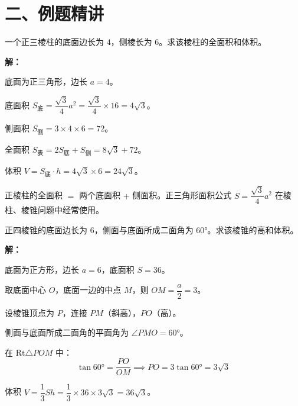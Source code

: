 \documentclass[12pt, a4paper]{ctexart}
\begin{document}
\section*{\textcolor{examorange}{二、例题精讲}}

\begin{examplebox}[【例题1】正三棱柱的体积与表面积]
一个正三棱柱的底面边长为 $4$，侧棱长为 $6$。求该棱柱的全面积和体积。
\end{examplebox}

\textbf{解：}

底面为正三角形，边长 $a = 4$。

底面积 $S_{\text{底}} = \dfrac{\sqrt{3}}{4} a^2 = \dfrac{\sqrt{3}}{4} \times 16 = 4\sqrt{3}$。

侧面积 $S_{\text{侧}} = 3 \times 4 \times 6 = 72$。

全面积 $S_{\text{表}} = 2S_{\text{底}} + S_{\text{侧}} = 8\sqrt{3} + 72$。

体积 $V = S_{\text{底}} \cdot h = 4\sqrt{3} \times 6 = 24\sqrt{3}$。

\begin{tipbox}[方法总结]
正棱柱的全面积 $=$ 两个底面积 $+$ 侧面积。正三角形面积公式 $S = \dfrac{\sqrt{3}}{4}a^2$ 在棱柱、棱锥问题中经常使用。
\end{tipbox}

\vspace{6pt}

\begin{examplebox}[【例题2】正四棱锥的体积]
正四棱锥的底面边长为 $6$，侧面与底面所成二面角为 $60°$。求该棱锥的高和体积。
\end{examplebox}

\textbf{解：}

底面为正方形，边长 $a = 6$，底面积 $S = 36$。

取底面中心 $O$，底面一边的中点 $M$，则 $OM = \dfrac{a}{2} = 3$。

设棱锥顶点为 $P$，连接 $PM$（斜高），$PO$（高）。

侧面与底面所成二面角的平面角为 $\angle PMO = 60°$。

在 $\mathrm{Rt}\triangle POM$ 中：
\[
\tan 60° = \frac{PO}{OM} \implies PO = 3\tan 60° = 3\sqrt{3}
\]

体积 $V = \dfrac{1}{3}Sh = \dfrac{1}{3} \times 36 \times 3\sqrt{3} = 36\sqrt{3}$。
\end{document}
